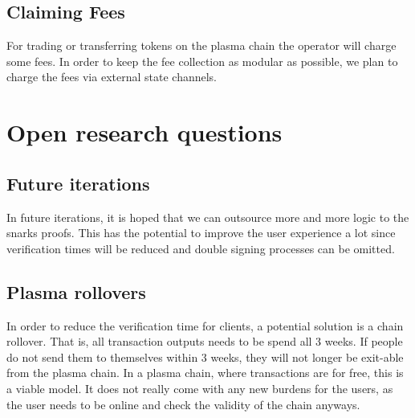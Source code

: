 \documentclass[11pt,parskip=full]{scrartcl}%
\begin{document}
\subsection{Claiming Fees}
For trading or transferring tokens on the plasma chain the operator will charge some fees. In order to keep the fee collection as modular as possible, we plan to charge the fees via external state channels.

\section{Open research questions}

\subsection{Future iterations}
In future iterations, it is hoped that we can outsource more and more logic to the snarks proofs. 
This has the potential to improve the user experience a lot since verification times will be reduced and double signing processes can be omitted. 

\subsection{Plasma rollovers}
In order to reduce the verification time for clients, a potential solution is a chain rollover. 
That is, all transaction outputs needs to be spend all 3 weeks. 
If people do not send them to themselves within 3 weeks, they will not longer be exit-able from the plasma chain. 
In a plasma chain, where transactions are for free, this is a viable model. 
It does not really come with any new burdens for the users, as the user needs to be online and check the validity of the chain anyways.
\end{document}
